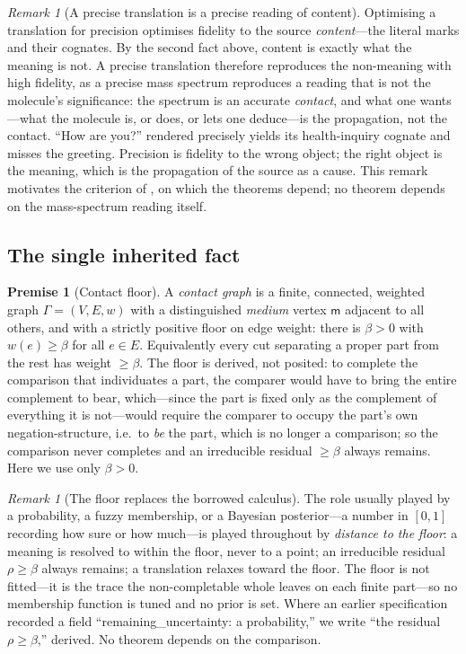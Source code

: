 \documentclass[11pt,a4paper]{article}
\theoremstyle{thmstyle}
\theoremstyle{definition}
\newtheorem{axiom}{Premise}
\theoremstyle{remark}
\newtheorem{remark}[theorem]{Remark}
\newcommand{\Gph}{\Gamma}
\newcommand{\V}{V}
\newcommand{\E}{E}
\newcommand{\wt}{w}
\newcommand{\med}{\mathsf{m}}          %
\newcommand{\flo}{\beta}               %
\newcommand{\res}{\rho}                %
\begin{document}
\begin{remark}[A precise translation is a precise reading of content]
\label{rem:massspec}
Optimising a translation for precision optimises fidelity to the source
\emph{content}---the literal marks and their cognates. By the second fact
above, content is exactly what the meaning is not. A precise translation
therefore reproduces the non-meaning with high fidelity, as a precise mass
spectrum reproduces a reading that is not the molecule's significance: the
spectrum is an accurate \emph{contact}, and what one wants---what the
molecule is, or does, or lets one deduce---is the propagation, not the
contact. ``How are you?'' rendered precisely yields its health-inquiry
cognate and misses the greeting. Precision is fidelity to the wrong object;
the right object is the meaning, which is the propagation of the source as a
cause. This remark motivates the criterion of , on which
the theorems depend; no theorem depends on the mass-spectrum reading itself.
\end{remark}

\subsection{The single inherited fact}

\begin{axiom}[Contact floor]
\label{ax:floor}
A \emph{contact graph} is a finite, connected, weighted graph
$\Gph=(\V,\E,\wt)$ with a distinguished \emph{medium} vertex $\med$ adjacent
to all others, and with a strictly positive floor on edge weight: there is
$\flo>0$ with $\wt(e)\ge\flo$ for all $e\in\E$. Equivalently every cut
separating a proper part from the rest has weight $\ge\flo$. The floor is
derived, not posited: to complete the comparison that individuates a part,
the comparer would have to bring the entire complement to bear, which---since
the part is fixed only as the complement of everything it is not---would
require the comparer to occupy the part's own negation-structure, i.e.\ to
\emph{be} the part, which is no longer a comparison; so the comparison never
completes and an irreducible residual $\ge\flo$ always remains. Here we use
only $\flo>0$.
\end{axiom}

\begin{remark}[The floor replaces the borrowed calculus]
\label{rem:floor-replaces}
The role usually played by a probability, a fuzzy membership, or a Bayesian
posterior---a number in $[0,1]$ recording how sure or how much---is played
throughout by \emph{distance to the floor}: a meaning is resolved to within
the floor, never to a point; an irreducible residual $\res\ge\flo$ always
remains; a translation relaxes toward the floor. The floor is not fitted---it
is the trace the non-completable whole leaves on each finite part---so no
membership function is tuned and no prior is set. Where an earlier
specification recorded a field ``remaining\_uncertainty: a probability,'' we
write ``the residual $\res\ge\flo$,'' derived. No theorem depends on the
comparison.
\end{remark}
\end{document}
